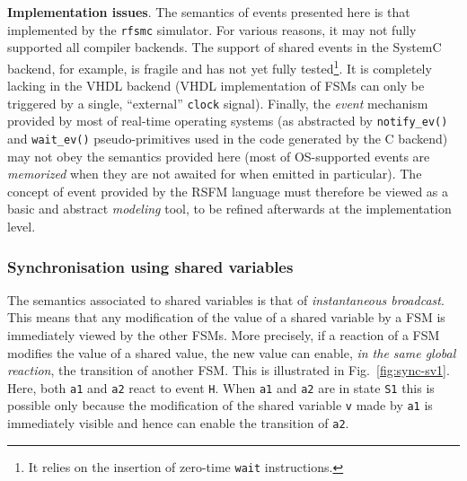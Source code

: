 \medskip \textbf{Implementation issues}.  The semantics of events presented here is that implemented
by the \texttt{rfsmc} simulator. For various reasons, it may not fully supported all compiler
backends.  The support of shared events in the SystemC backend, for example, is fragile and has not
yet fully tested\footnote{It relies on the insertion of zero-time \texttt{wait} instructions.}. It
is completely lacking in the VHDL backend (VHDL implementation of FSMs can only be triggered by a
single, ``external'' \texttt{clock} signal).  Finally, the \emph{event} mechanism provided by most
of real-time operating systems (as abstracted by \verb|notify_ev()| and \verb|wait_ev()|
pseudo-primitives used in the code generated by the C backend) may not obey the semantics provided
here (most of OS-supported events are \emph{memorized} when they are not awaited for when emitted in
particular). The concept of event provided by the RSFM language must therefore be viewed as a basic
and abstract \emph{modeling} tool, to be refined afterwards at the implementation level.

\subsubsection*{Synchronisation using shared variables}

The semantics associated to shared variables is that
of \emph{instantaneous broadcast}. This means that any modification of the value of a shared variable by a
FSM is immediately viewed by the other FSMs. More precisely, if a reaction of a FSM modifies the
value of a shared value, the new value can enable, \emph{in the same global reaction}, the
transition of another FSM. This is illustrated in Fig.~\ref{fig:sync-sv1}. Here, both \texttt{a1}
and \texttt{a2} react to event \texttt{H}. When \texttt{a1} and \texttt{a2} are in state \texttt{S1} this is possible
only because the modification of the shared variable \texttt{v} made by \texttt{a1} is immediately
visible and hence can enable the transition of \texttt{a2}.

